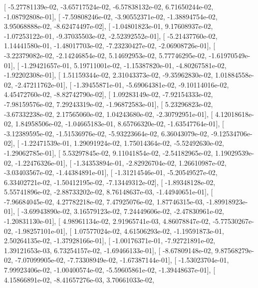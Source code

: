\documentclass{article}
\begin{document}
       [ -5.27781139e-02,  -3.65717524e-02,  -6.57838132e-02,
          6.71650244e-02,  -1.08792808e-01],
       [ -7.59808246e-02,  -3.90552371e-02,  -1.38894754e-02,
          3.95068888e-02,  -8.62474497e-02],
       [ -1.04801823e-01,   9.17608937e-02,  -1.07253122e-01,
         -9.37035503e-02,  -2.52392552e-01],
       [ -5.21437760e-02,   1.14441580e-01,  -1.48017703e-02,
         -7.23230427e-02,  -2.06908726e-01],
       [ -3.22379082e-02,  -2.14246854e-02,   5.14692953e-02,
          5.77746295e-02,  -1.61970549e-01],
       [ -1.29421657e-01,   5.19711001e-02,  -1.15387820e-01,
         -4.80267581e-02,  -1.92202308e-01],
       [  1.51159344e-02,   2.31043373e-02,  -9.35962830e-02,
          1.01884558e-02,  -2.47211762e-01],
       [ -1.39455871e-01,  -5.69064381e-02,  -9.10114016e-02,
          4.45472760e-02,  -8.82742790e-02],
       [  1.09283149e-02,  -7.92154333e-02,  -7.98159576e-02,
          7.29243319e-02,  -1.96872583e-01],
       [  5.23296823e-02,  -3.67332238e-02,   2.17565060e-02,
          1.04243680e-02,  -2.30792951e-01],
       [  4.12018618e-02,   1.84958506e-02,  -1.04665183e-01,
          8.65766320e-02,  -1.63547764e-01],
       [ -3.12389595e-02,  -1.51536976e-02,  -5.93223664e-02,
          6.36043079e-02,  -9.12534706e-02],
       [ -1.22471539e-01,   1.29091924e-02,   1.75014364e-02,
         -5.52492630e-02,  -1.29062785e-01],
       [  5.53297845e-02,   9.11041854e-02,  -2.54182965e-02,
          1.19029539e-02,  -1.22476326e-01],
       [ -1.34353894e-01,  -2.82926704e-02,   1.26610987e-02,
         -3.03403567e-02,  -1.44384891e-01],
       [ -1.31214546e-01,  -5.20549527e-02,   6.33402721e-02,
         -1.50412195e-02,  -7.13449312e-02],
       [ -1.89348128e-02,   5.55741896e-02,  -2.88733202e-02,
          8.76148637e-03,  -1.44940651e-01],
       [ -7.96684045e-02,   4.27782218e-02,   7.47925076e-02,
          1.87746315e-03,  -1.89918923e-01],
       [ -3.69943890e-02,   3.16579123e-02,   7.24449606e-02,
         -2.47830961e-02,  -1.20831130e-01],
       [  4.98961134e-02,   2.91965741e-03,   4.86078847e-02,
         -5.77530267e-02,  -1.98257101e-01],
       [  1.07577024e-02,   4.61506293e-02,  -1.19591873e-01,
          2.50264135e-02,  -1.37928166e-01],
       [ -1.00176371e-01,  -7.92721891e-02,   1.39121653e-03,
          6.73254157e-02,  -1.69466133e-01],
       [ -8.67809148e-02,   9.87568279e-02,  -7.07099905e-02,
         -7.73308949e-02,  -1.67387144e-01],
       [ -1.53023704e-01,   7.99923406e-02,  -1.00400574e-02,
         -5.59605861e-02,  -1.39448637e-01],
       [  4.15866891e-02,  -8.41657276e-03,   3.70661033e-02,
\end{document}
